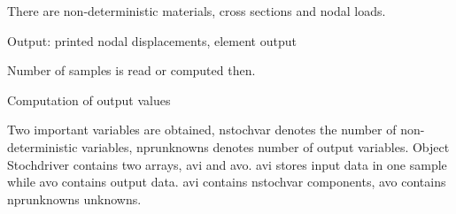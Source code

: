 There are non-deterministic materials, cross sections and nodal loads.

Output: printed nodal displacements, element output


Number of samples is read or computed then.

Computation of output values

Two important variables are obtained, nstochvar denotes the number
of non-deterministic variables, nprunknowns denotes number of
output variables.
Object Stochdriver contains two arrays, avi and avo. avi stores input
data in one sample while avo contains output data. avi contains nstochvar
components, avo contains nprunknowns unknowns.
